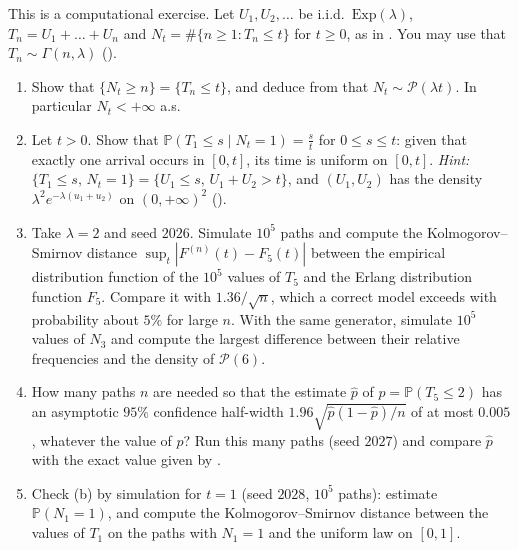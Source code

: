 \begin{exercise}\label{ex:tr-poisson-process}
\medium This is a computational exercise. Let $U_1,U_2,\dots$ be i.i.d.\ $\mathrm{Exp}(\lambda)$,
$T_n=U_1+\dots+U_n$ and $N_t=\#\{n\ge1:T_n\le t\}$ for $t\ge0$, as in
. You may use that $T_n\sim\Gamma(n,\lambda)$
().
\begin{enumerate}[label=(\alph*)]
  \item Show that $\{N_t\ge n\}=\{T_n\le t\}$, and deduce from  that
    $N_t\sim\mathcal P(\lambda t)$. In particular $N_t<+\infty$ a.s.
  \item Let $t>0$. Show that $\mathbb P(T_1\le s\mid N_t=1)=\frac st$ for $0\le s\le t$: given that
    exactly one arrival occurs in $[0,t]$, its time is uniform on $[0,t]$. \emph{Hint:}
    $\{T_1\le s,\,N_t=1\}=\{U_1\le s,\,U_1+U_2>t\}$, and $(U_1,U_2)$ has the density
    $\lambda^2e^{-\lambda(u_1+u_2)}$ on $(0,+\infty)^2$ ().
  \item Take $\lambda=2$ and seed $2026$. Simulate $10^5$ paths and compute the
    Kolmogorov--Smirnov distance $\sup_t|F^{(n)}(t)-F_5(t)|$ between the empirical distribution
    function of the $10^5$ values of $T_5$ and the Erlang distribution function $F_5$. Compare it
    with $1.36/\sqrt n$, which a correct model exceeds with probability about $5\%$ for large $n$.
    With the same generator, simulate $10^5$ values of $N_3$ and compute the largest difference
    between their relative frequencies and the density of $\mathcal P(6)$.
  \item How many paths $n$ are needed so that the estimate $\hat p$ of $p=\mathbb P(T_5\le2)$ has an
    asymptotic $95\%$ confidence half-width $1.96\sqrt{\hat p(1-\hat p)/n}$ of at most $0.005$,
    whatever the value of $p$? Run this many paths (seed $2027$) and compare $\hat p$ with the exact
    value given by .
  \item Check (b) by simulation for $t=1$ (seed $2028$, $10^5$ paths): estimate $\mathbb P(N_1=1)$,
    and compute the Kolmogorov--Smirnov distance between the values of $T_1$ on the paths with
    $N_1=1$ and the uniform law on $[0,1]$.
\end{enumerate}
\end{exercise}

